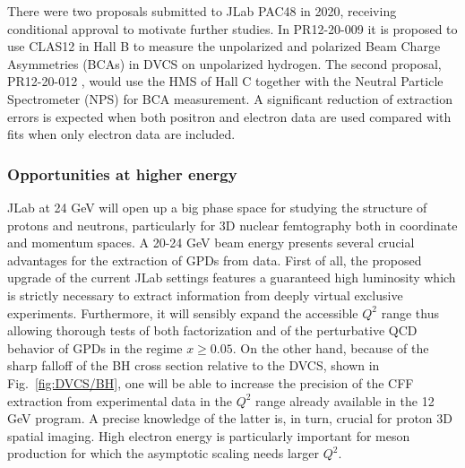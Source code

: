 There were two proposals submitted to JLab PAC48 in 2020, receiving conditional approval to motivate further studies. In PR12-20-009 \cite{C12-20-009} it is proposed to use CLAS12 in Hall B to measure the unpolarized and polarized Beam Charge Asymmetries (BCAs) in DVCS on unpolarized hydrogen. The second proposal, PR12-20-012 \cite{C12-20-012}, would use the HMS of Hall C together with the Neutral Particle Spectrometer (NPS) for BCA measurement. 
A significant reduction of extraction errors is expected when both positron and electron data are used compared with fits when only electron data are included. %

\iffalse
\begin{figure}
\begin{center}
\texttt{[image: Figures/hallc\_pos\_el\_gpdH.pdf]}
\end{center}
\caption{Figure from PR12-20-012: extraction of CFFs from fits to the experimental measurements. The first column in the left shows the
results of the helicity-conserving CFFs when both positron and electron data are used in the fit
(dark symbols), and when only the electron approved data is used (open symbols). The second and third columns
show the same information for the helicity-flip CFFs. The solid horizontal lines indicate the input
values used to generate the cross-section data.}
\label{fig:cff}
\end{figure}
\fi 

\subsubsection*{Opportunities at higher energy}

JLab at 24 GeV will open up a big phase space for studying the structure of protons and neutrons, particularly for 3D nuclear femtography both
in coordinate and momentum spaces.
%
A 20-24 GeV beam energy presents several crucial advantages for the extraction of GPDs from data. First of all, the proposed upgrade of the current JLab settings features a guaranteed high luminosity which is strictly necessary to extract information from deeply virtual exclusive experiments. Furthermore, it will sensibly expand the accessible $Q^2$ range thus allowing thorough tests of both factorization and of the perturbative QCD behavior of GPDs in the regime $x \geq 0.05$. On the other hand, because of the sharp falloff of the BH cross section relative to the DVCS, shown in Fig.~\ref{fig:DVCS/BH},
one will be able to increase the precision  of the CFF extraction from experimental data in the $Q^2$ range already available in the 12 GeV program. A precise knowledge of the latter is, in turn, crucial for proton 3D spatial imaging. High electron energy is particularly important for meson production for which the asymptotic scaling needs larger $Q^2$. 

